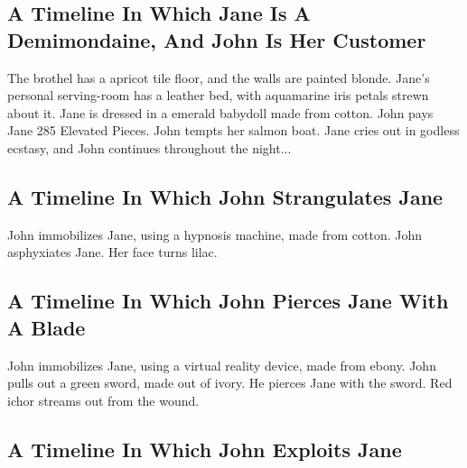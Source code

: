 \documentclass{article}
\begin{document}
\subsection{A Timeline In Which Jane Is A Demimondaine, And John Is Her Customer}


The brothel has a apricot tile floor, and the walls are painted blonde.
Jane's personal serving{-}room has a leather bed, with aquamarine iris petals strewn about it.
Jane is dressed in a emerald babydoll made from cotton.
John pays Jane 285 Elevated Pieces.
John tempts her salmon boat.
Jane cries out in godless ecstasy, and John continues throughout the night...
\subsection{A Timeline In Which John Strangulates Jane}


John immobilizes Jane, using a hypnosis machine, made from cotton.
John asphyxiates Jane.
Her face turns lilac.
\subsection{A Timeline In Which John Pierces Jane With A Blade}


John immobilizes Jane, using a virtual reality device, made from ebony.
John pulls out a green sword, made out of ivory.
He pierces Jane with the sword.
Red ichor streams out from the wound.
\subsection{A Timeline In Which John Exploits Jane}
\end{document}

